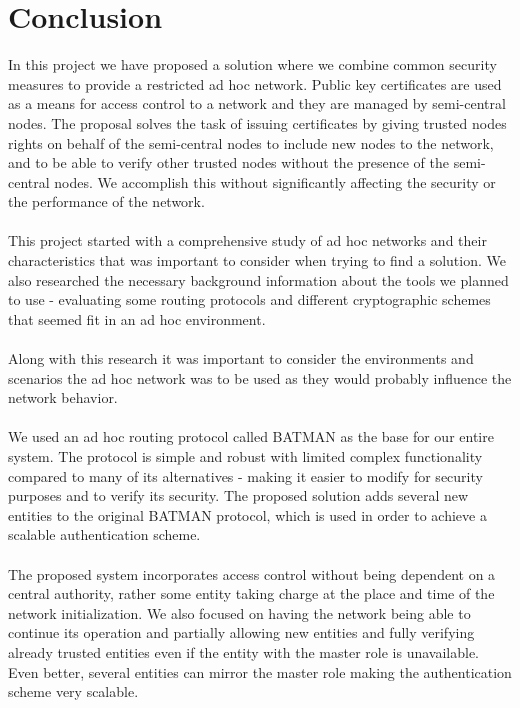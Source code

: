 \chapter{Conclusion}
\label{conclusion}

In this project we have proposed a solution where we combine common security measures to provide a restricted ad hoc network. Public key certificates are used as a means for access control to a network and they are managed by semi-central nodes. The proposal solves the task of issuing certificates by giving trusted nodes rights on behalf of the semi-central nodes to include new nodes to the network, and to be able to verify other trusted nodes without the presence of the semi-central nodes. We accomplish this without significantly affecting the security or the performance of the network.
\\\\
This project started with a comprehensive study of ad hoc networks and their characteristics that was important to consider when trying to find a solution. We also researched the necessary background information about the tools we planned to use - evaluating some routing protocols and different cryptographic schemes that seemed fit in an ad hoc environment.
\\\\
Along with this research it was important to consider the environments and scenarios the ad hoc network was to be used as they would probably influence the network behavior.
\\\\
We used an ad hoc routing protocol called BATMAN as the base for our entire system. The protocol is simple and robust with limited complex functionality compared to many of its alternatives - making it easier to modify for security purposes and to verify its security. The proposed solution adds several new entities to the original BATMAN protocol, which is used in order to achieve a scalable authentication scheme.
\\\\
The proposed system incorporates access control without being dependent on a central authority, rather some entity taking charge at the place and time of the network initialization. We also focused on having the network being able to continue its operation and partially allowing new entities and fully verifying already trusted entities even if the entity with the master role is unavailable.  Even better, several entities can mirror the master role making the authentication scheme very scalable.
